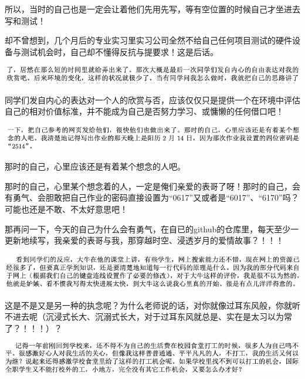 \documentclass[9pt, b5paper]{article}
\begin{document}
所以，当时的自己也是一定会让着他们先用先写，等有空位置的时候自己才坐进去写和测试！

却不曾想到，几个月后的专业实习里实习公司全然不给自己任何项目测试的硬件设备与测试机会时，自己却不懂得反抗与提要求！这是后话。 

\begin{center}
\includegraphics[width=.9\linewidth]{./pic/backups_plans_20210502_120254.png}
\end{center}

同学们发自内心的表达对一个人的欣赏与否，应该仅仅只是提供一个在环境中评估自己的相对价值标准，并不能成为自己是否努力学习、或慵懒的任何借口吧！

\begin{center}
\includegraphics[width=.9\linewidth]{./pic/backups_plans_20210502_120523.png}
\end{center}

那时的自己，心里应该还是有着某个想念的人吧。

那时的自己，心里某个想念着的人，一定是俺们亲爱的表哥了呀！那时的自己，会有勇气、会胆敢把自己作业的密码直接设置为“0617”又或者是“6017”、“6170”吗？可能也还是不敢、不太好意思吧！

那再问一下，今天的自己为什么会有勇气，在自已的github的仓库里，每天至少一更新地续写，我亲爱的表哥与我，那穿越时空、浸透岁月的爱情故事？！！！

\begin{center}
\includegraphics[width=.9\linewidth]{./pic/backups_plans_20210424_214908.png}
\end{center}

这是不是又是另一种的执念呢？为什么老师说的话，对你就像过耳东风般，你就听不进去呢（沉浸式长大、沉溺式长大，对于过耳东风就总是、实在是太习以为常了？！！！）？

\begin{center}
\includegraphics[width=.9\linewidth]{./pic/backups_plans_20210424_220444.png}
\end{center}
\end{document}
